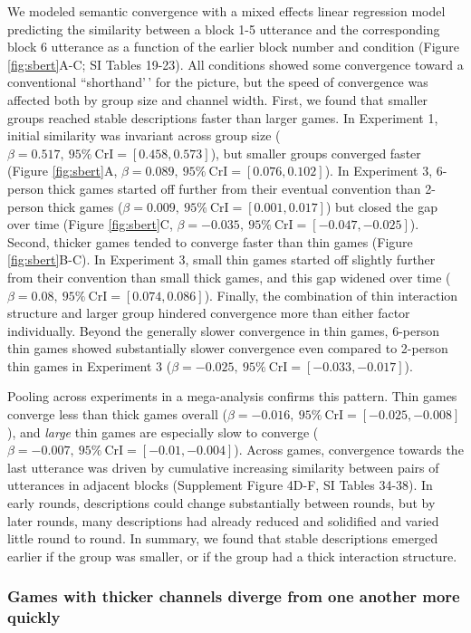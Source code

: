 \documentclass[
  english,
]{article}
\begin{document}
We modeled semantic convergence with a mixed effects linear regression model predicting the similarity between a block 1-5 utterance and the corresponding block 6 utterance as a function of the earlier block number and condition (Figure \ref{fig:sbert}A-C; SI Tables 19-23).
All conditions showed some convergence toward a conventional ``shorthand'\,' for the picture, but the speed of convergence was affected both by group size and channel width.
First, we found that smaller groups reached stable descriptions faster than larger games.
In Experiment 1, initial similarity was invariant across group size (\(\beta=0.517,\:95\%\:\mathrm{CrI}=[0.458, 0.573]\)), but smaller groups converged faster (Figure \ref{fig:sbert}A, \(\beta=0.089,\:95\%\:\mathrm{CrI}=[0.076, 0.102]\)).
In Experiment 3, 6-person thick games started off further from their eventual convention than 2-person thick games (\(\beta=0.009,\:95\%\:\mathrm{CrI}=[0.001, 0.017]\)) but closed the gap over time (Figure \ref{fig:sbert}C, \(\beta=-0.035,\:95\%\:\mathrm{CrI}=[-0.047, -0.025]\)).
Second, thicker games tended to converge faster than thin games (Figure \ref{fig:sbert}B-C).
In Experiment 3, small thin games started off slightly further from their convention than small thick games, and this gap widened over time (\(\beta=0.08,\:95\%\:\mathrm{CrI}=[0.074, 0.086]\)).
Finally, the combination of thin interaction structure and larger group hindered convergence more than either factor individually.
Beyond the generally slower convergence in thin games, 6-person thin games showed substantially slower convergence even compared to 2-person thin games in Experiment 3 (\(\beta=-0.025,\:95\%\:\mathrm{CrI}=[-0.033, -0.017]\)).

Pooling across experiments in a mega-analysis confirms this pattern.
Thin games converge less than thick games overall (\(\beta=-0.016,\:95\%\:\mathrm{CrI}=[-0.025, -0.008]\)), and \emph{large} thin games are especially slow to converge (\(\beta=-0.007,\:95\%\:\mathrm{CrI}=[-0.01, -0.004]\)).
Across games, convergence towards the last utterance was driven by cumulative increasing similarity between pairs of utterances in adjacent blocks (Supplement Figure 4D-F, SI Tables 34-38).
In early rounds, descriptions could change substantially between rounds, but by later rounds, many descriptions had already reduced and solidified and varied little round to round.
In summary, we found that stable descriptions emerged earlier if the group was smaller, or if the group had a thick interaction structure.

\hypertarget{games-with-thicker-channels-diverge-from-one-another-more-quickly}{%
\subsubsection{Games with thicker channels diverge from one another more quickly}\label{games-with-thicker-channels-diverge-from-one-another-more-quickly}}
\end{document}
